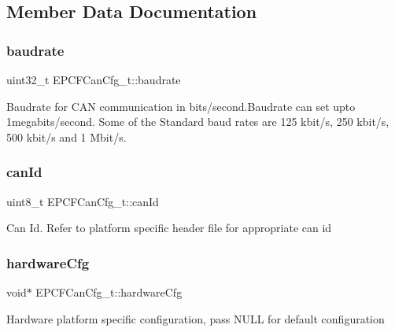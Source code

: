 \subsection{Member Data Documentation}
\mbox{\label{structEPCFCanCfg__t_a46a8db33ee1fcee6d9648a406fa6dfe2}} 
\subsubsection{\texorpdfstring{baudrate}{baudrate}}
{\footnotesize\ttfamily uint32\+\_\+t E\+P\+C\+F\+Can\+Cfg\+\_\+t\+::baudrate}

Baudrate for C\+AN communication in bits/second.\+Baudrate can set upto 1megabits/second. Some of the Standard baud rates are 125 kbit/s, 250 kbit/s, 500 kbit/s and 1 Mbit/s. \mbox{\label{structEPCFCanCfg__t_a66231ee69af11845a8bb8f37488c39c7}} 
\subsubsection{\texorpdfstring{can\+Id}{canId}}
{\footnotesize\ttfamily uint8\+\_\+t E\+P\+C\+F\+Can\+Cfg\+\_\+t\+::can\+Id}

Can Id. Refer to platform specific header file for appropriate can id \mbox{\label{structEPCFCanCfg__t_af8295786602b4ea0f5872bbc21912dee}} 
\subsubsection{\texorpdfstring{hardware\+Cfg}{hardwareCfg}}
{\footnotesize\ttfamily void$\ast$ E\+P\+C\+F\+Can\+Cfg\+\_\+t\+::hardware\+Cfg}

Hardware platform specific configuration, pass N\+U\+LL for default configuration \mbox{\label{structEPCFCanCfg__t_a4127f7b6a5c2955945c76439a4a1cf46}} 
